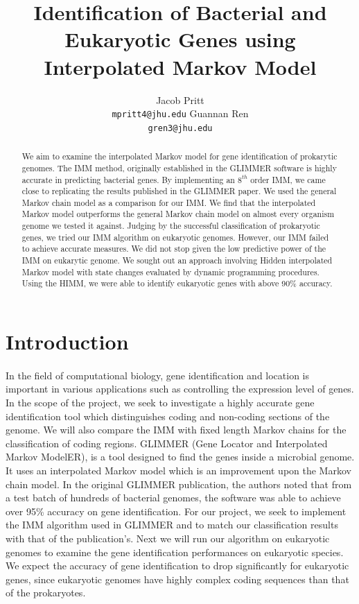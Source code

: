 \documentclass[11pt,letterpaper]{article}
\title{Identification of Bacterial and Eukaryotic Genes using Interpolated Markov Model}
\author{Jacob Pritt\\
  {\tt mpritt4@jhu.edu}
  \And
  Guannan Ren \\
  {\tt gren3@jhu.edu}}
\date{}
\begin{document}
\maketitle
\begin{abstract}
	We aim to examine the interpolated Markov model for gene identification of prokarytic genomes. The IMM method, originally established in the GLIMMER software is highly accurate in predicting bacterial genes. By implementing an $8^{th}$ order IMM, we came close to replicating the results published in the GLIMMER paper. We used the general Markov chain model as a comparison for our IMM. We find that the interpolated Markov model outperforms the general Markov chain model on almost every organism genome we tested it against. Judging by the successful classification of prokaryotic genes, we tried our IMM algorithm on eukaryotic genomes. However, our IMM failed to achieve accurate measures. We did not stop given the low predictive power of the IMM on eukarytic genome. We sought out an approach involving Hidden interpolated Markov model with state changes evaluated by dynamic programming procedures. Using the HIMM, we were able to identify eukaryotic genes with above 90\% accuracy.
\end{abstract}

\section{Introduction}
\paragraph{}
In the field of computational biology, gene identification and location is important in various applications such as controlling the expression level of genes. In the scope of the project, we seek to investigate a highly accurate gene identification tool which distinguishes coding and non-coding sections of the genome. We will also compare the IMM with fixed length Markov chains for the classification of coding regions. GLIMMER (Gene Locator and Interpolated Markov ModelER), is a tool designed to find the genes inside a microbial genome. It uses an interpolated Markov model which is an improvement upon the Markov chain model. In the original GLIMMER publication, the authors noted that from a test batch of hundreds of bacterial genomes, the software was able to achieve over 95\% accuracy on gene identification. For our project, we seek to implement the IMM algorithm used in GLIMMER and to match our classification results with that of the publication's. Next we will run our algorithm on eukaryotic genomes to examine the gene identification performances on eukaryotic species. We expect the accuracy of gene identification to drop significantly for eukaryotic genes, since eukaryotic genomes have highly complex coding sequences than that of the prokaryotes.\\
\end{document}
